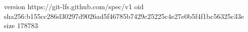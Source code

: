version https://git-lfs.github.com/spec/v1
oid sha256:b155cc286d30297d9026ad5f46785b7429c25225c4e27e0b5f4f1bc56325c33e
size 178783
